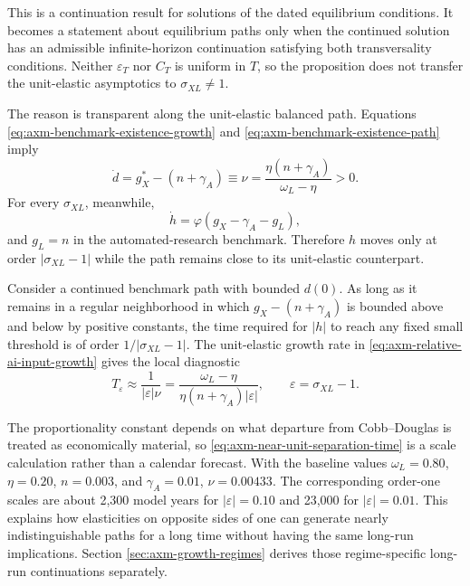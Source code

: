 This is a continuation result for solutions of the dated equilibrium
conditions. It becomes a statement about equilibrium paths only when the
continued solution has an admissible infinite-horizon continuation satisfying both
transversality conditions. Neither \(\varepsilon_T\) nor \(C_T\) is uniform in
\(T\), so the proposition does not transfer the unit-elastic asymptotics to
\(\sigma_{XL}\neq1\).

The reason is transparent along the unit-elastic balanced path. Equations
\eqref{eq:axm-benchmark-existence-growth} and
\eqref{eq:axm-benchmark-existence-path} imply
\begin{equation}
 \dot d=g_X^*-(n+\gamma_A)
 \equiv\nu
 =\frac{\eta(n+\gamma_A)}{\omega_L-\eta}>0.
 \label{eq:axm-relative-ai-input-growth}
\end{equation}
For every \(\sigma_{XL}\), meanwhile,
\begin{equation}
 \dot h=\varphi\left(g_X-\gamma_A-g_L\right),
 \label{eq:axm-near-unit-slow-law}
\end{equation}
and \(g_L=n\) in the automated-research benchmark. Therefore \(h\) moves only
at order \(|\sigma_{XL}-1|\) while the path remains close to its unit-elastic
counterpart.

\begin{proposition}
\label{prop:axm-near-unit-separation-scale}
Consider a continued benchmark path with bounded \(d(0)\). As long as it
remains in a regular neighborhood in which
\(g_X-(n+\gamma_A)\) is bounded above and below by positive constants, the time required
for \(|h|\) to reach any fixed small threshold is of order
\(1/|\sigma_{XL}-1|\). The unit-elastic growth rate in
\eqref{eq:axm-relative-ai-input-growth} gives the local diagnostic
\begin{equation}
 T_{\varepsilon}\approx
 \frac{1}{|\varepsilon|\nu}
 =\frac{\omega_L-\eta}
 {\eta(n+\gamma_A)|\varepsilon|},
 \qquad \varepsilon=\sigma_{XL}-1.
 \label{eq:axm-near-unit-separation-time}
\end{equation}
\end{proposition}

The proportionality constant depends on what departure from Cobb--Douglas is
treated as economically material, so \eqref{eq:axm-near-unit-separation-time}
is a scale calculation rather than a calendar forecast. With the baseline
values \(\omega_L=0.80\), \(\eta=0.20\), \(n=0.003\), and
\(\gamma_A=0.01\), \(\nu=0.00433\). The corresponding order-one scales are
about 2,300 model years for \(|\varepsilon|=0.10\) and 23,000 for
\(|\varepsilon|=0.01\). This explains how elasticities on opposite sides of
one can generate nearly indistinguishable paths for a long time without having
the same long-run implications. Section \ref{sec:axm-growth-regimes} derives
those regime-specific long-run continuations separately.
